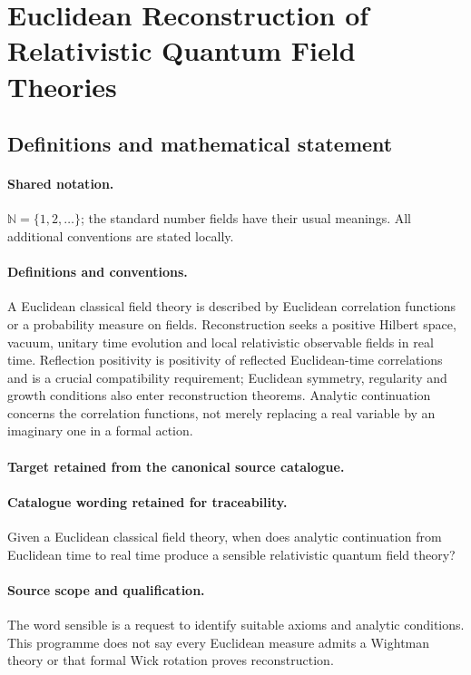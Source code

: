 \documentclass[11pt]{article}
\begin{document}
\section{Euclidean Reconstruction of Relativistic Quantum Field Theories}\label{statement}

\subsection{Definitions and mathematical statement}

\paragraph{Shared notation.}$\mathbb N=\{1,2,\ldots\}$; the standard number fields have their usual meanings. All additional conventions are stated locally.


\paragraph{Definitions and conventions.}
A Euclidean classical field theory is described by Euclidean correlation functions or a probability measure on fields. Reconstruction seeks a positive Hilbert space, vacuum, unitary time evolution and local relativistic observable fields in real time. Reflection positivity is positivity of reflected Euclidean-time correlations and is a crucial compatibility requirement; Euclidean symmetry, regularity and growth conditions also enter reconstruction theorems. Analytic continuation concerns the correlation functions, not merely replacing a real variable by an imaginary one in a formal action.

\paragraph{Target retained from the canonical source catalogue.}
\paragraph{Catalogue wording retained for traceability.}
Given a Euclidean classical field theory, when does analytic continuation from Euclidean time to real time produce a sensible relativistic quantum field theory?

\paragraph{Source scope and qualification.}
The word sensible is a request to identify suitable axioms and analytic conditions. This programme does not say every Euclidean measure admits a Wightman theory or that formal Wick rotation proves reconstruction.
\end{document}
